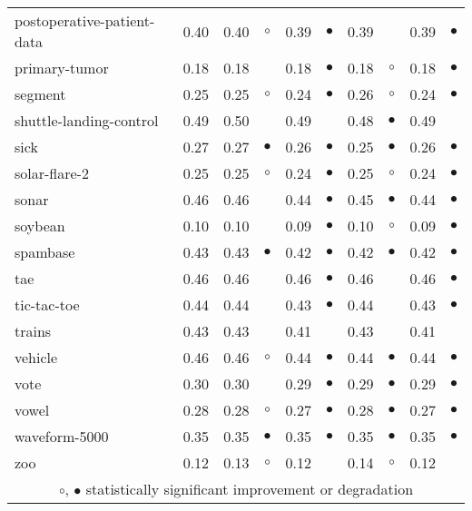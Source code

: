 {\begin{longtable}{lrr@{\hspace{0.1cm}}cr@{\hspace{0.1cm}}cr@{\hspace{0.1cm}}cr@{\hspace{0.1cm}}c}
postoperative-patient-data & 0.40 & 0.40 &    $\circ$ & 0.39 & $\bullet$ & 0.39 &            & 0.39 & $\bullet$\\
primary-tumor & 0.18 & 0.18 &            & 0.18 & $\bullet$ & 0.18 &    $\circ$ & 0.18 & $\bullet$\\
segment & 0.25 & 0.25 &    $\circ$ & 0.24 & $\bullet$ & 0.26 &    $\circ$ & 0.24 & $\bullet$\\
shuttle-landing-control & 0.49 & 0.50 &            & 0.49 &           & 0.48 &  $\bullet$ & 0.49 &          \\
sick & 0.27 & 0.27 &  $\bullet$ & 0.26 & $\bullet$ & 0.25 &  $\bullet$ & 0.26 & $\bullet$\\
solar-flare-2 & 0.25 & 0.25 &    $\circ$ & 0.24 & $\bullet$ & 0.25 &    $\circ$ & 0.24 & $\bullet$\\
sonar & 0.46 & 0.46 &            & 0.44 & $\bullet$ & 0.45 &  $\bullet$ & 0.44 & $\bullet$\\
soybean & 0.10 & 0.10 &            & 0.09 & $\bullet$ & 0.10 &    $\circ$ & 0.09 & $\bullet$\\
spambase & 0.43 & 0.43 &  $\bullet$ & 0.42 & $\bullet$ & 0.42 &  $\bullet$ & 0.42 & $\bullet$\\
tae & 0.46 & 0.46 &            & 0.46 & $\bullet$ & 0.46 &            & 0.46 & $\bullet$\\
tic-tac-toe & 0.44 & 0.44 &            & 0.43 & $\bullet$ & 0.44 &            & 0.43 & $\bullet$\\
trains & 0.43 & 0.43 &            & 0.41 &           & 0.43 &            & 0.41 &          \\
vehicle & 0.46 & 0.46 &    $\circ$ & 0.44 & $\bullet$ & 0.44 &  $\bullet$ & 0.44 & $\bullet$\\
vote & 0.30 & 0.30 &            & 0.29 & $\bullet$ & 0.29 &  $\bullet$ & 0.29 & $\bullet$\\
vowel & 0.28 & 0.28 &    $\circ$ & 0.27 & $\bullet$ & 0.28 &  $\bullet$ & 0.27 & $\bullet$\\
waveform-5000 & 0.35 & 0.35 &  $\bullet$ & 0.35 & $\bullet$ & 0.35 &  $\bullet$ & 0.35 & $\bullet$\\
zoo & 0.12 & 0.13 &    $\circ$ & 0.12 &           & 0.14 &    $\circ$ & 0.12 &          \\
\hline
\multicolumn{10}{c}{$\circ$, $\bullet$ statistically significant improvement or degradation}\\
\end{longtable} \footnotesize \par}